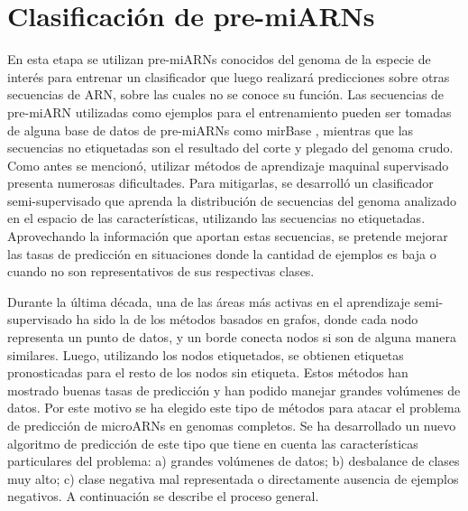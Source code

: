 \section{Clasificación de pre-miARNs}

En esta etapa se utilizan pre-miARNs conocidos del genoma de la especie de interés para entrenar un clasificador que luego realizará predicciones sobre otras
secuencias de ARN, sobre las cuales no se  conoce su función. Las secuencias de pre-miARN utilizadas como ejemplos para el entrenamiento pueden ser tomadas de
alguna base de datos de pre-miARNs como  mirBase \cite{kozomara2014mirbase}, mientras que las secuencias no etiquetadas son el resultado del corte y plegado del genoma
crudo. Como antes se mencionó, utilizar métodos de aprendizaje maquinal supervisado presenta numerosas dificultades. Para mitigarlas, se desarrolló
un clasificador semi-supervisado que aprenda la distribución de secuencias del genoma analizado en el espacio de las características, utilizando las
secuencias no etiquetadas. Aprovechando la información que aportan estas secuencias, se pretende mejorar las tasas de predicción en situaciones donde la
cantidad de ejemplos es baja o cuando no son representativos de sus respectivas clases.

Durante la última década, una de las áreas más activas en el aprendizaje semi-supervisado ha sido la de los métodos basados en grafos, donde cada nodo
representa un punto de datos, y un borde conecta nodos si son de alguna manera similares. Luego, utilizando los nodos etiquetados, se obtienen etiquetas
pronosticadas para el resto de los nodos sin etiqueta. Estos métodos han mostrado buenas tasas de predicción \citep{joachims2003transductive} y han podido
manejar grandes volúmenes de datos. Por este motivo se ha elegido este tipo de métodos para atacar el problema de predicción de microARNs en genomas
completos. Se ha desarrollado un nuevo algoritmo de predicción de este tipo que tiene en cuenta las características particulares del problema: a) grandes
volúmenes de datos; b) desbalance de clases muy alto; c) clase negativa mal representada o directamente ausencia de ejemplos negativos. A continuación se
describe el proceso general.

